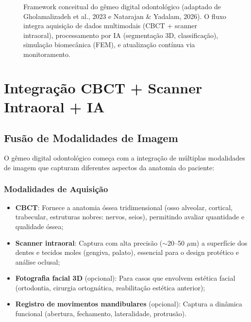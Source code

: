 \begin{figure}[H]
\caption{Framework conceitual do gêmeo digital odontológico (adaptado de Gholamalizadeh et al., 2023 e Natarajan \& Yadalam, 2026). O fluxo integra aquisição de dados multimodais (CBCT + scanner intraoral), processamento por IA (segmentação 3D, classificação), simulação biomecânica (FEM), e atualização contínua via monitoramento.}
\label{fig:digital-twin-framework}
\end{figure}


\section{Integração CBCT + Scanner Intraoral + IA}

\subsection{Fusão de Modalidades de Imagem}

O gêmeo digital odontológico começa com a integração de múltiplas modalidades de imagem que capturam diferentes aspectos da anatomia do paciente:

\subsubsection{Modalidades de Aquisição}

\begin{itemize}
    \item \textbf{CBCT}: Fornece a anatomia óssea tridimensional (osso alveolar, cortical, trabecular, estruturas nobres: nervos, seios), permitindo avaliar quantidade e qualidade óssea;
    \item \textbf{Scanner intraoral}: Captura com alta precisão ($\sim$20--50 $\mu$m) a superfície dos dentes e tecidos moles (gengiva, palato), essencial para o design protético e análise oclusal;
    \item \textbf{Fotografia facial 3D} (opcional): Para casos que envolvem estética facial (ortodontia, cirurgia ortognática, reabilitação estética anterior);
    \item \textbf{Registro de movimentos mandibulares} (opcional): Captura a dinâmica funcional (abertura, fechamento, lateralidade, protrusão).
\end{itemize}

